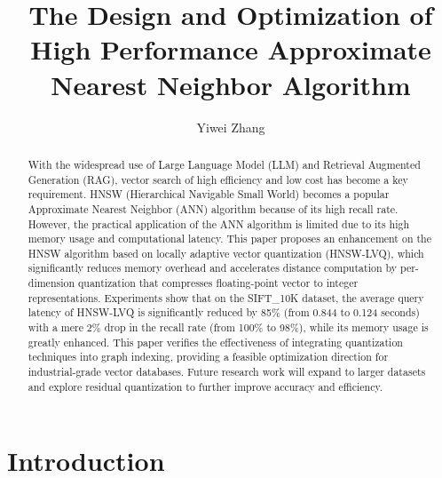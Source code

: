 \documentclass[sigconf, nonacm]{acmart}
\newcommand\vldbpagestyle{plain}
\begin{document}
\title{The Design and Optimization of High Performance Approximate Nearest Neighbor Algorithm}

\author{Yiwei Zhang}

\begin{abstract}
With the widespread use of Large Language Model (LLM) and Retrieval Augmented Generation (RAG), vector search of high efficiency and low cost has become a key requirement. HNSW (Hierarchical Navigable Small World) becomes a popular Approximate Nearest Neighbor (ANN) algorithm because of its high recall rate.  However, the practical application of the ANN algorithm is limited due to its high memory usage and computational latency.  
This paper proposes an enhancement on the HNSW algorithm based on locally adaptive vector quantization (HNSW-LVQ), which significantly reduces memory overhead and accelerates distance computation by per-dimension quantization that compresses floating-point vector to integer representations.
Experiments show that on the SIFT\_10K dataset, the average query latency of HNSW-LVQ is significantly reduced by 85\% (from 0.844 to 0.124 seconds) with a mere 2\% drop in the recall rate (from 100\% to 98\%), while its memory usage is greatly enhanced.  This paper verifies the effectiveness of integrating quantization techniques into graph indexing, providing a feasible optimization direction for industrial-grade vector databases.  Future research work will expand to larger datasets and explore residual quantization to further improve accuracy and efficiency.

\end{abstract}

\maketitle

\pagestyle{\vldbpagestyle}


\section{Introduction}
\end{document}
